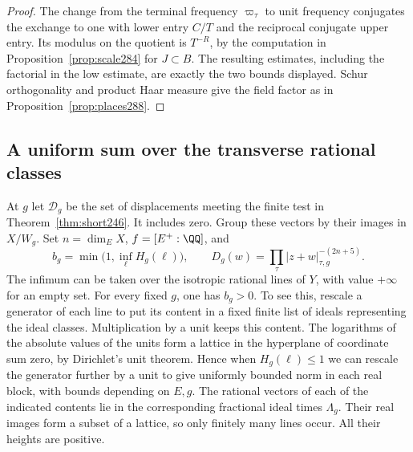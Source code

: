 \documentclass[a4paper,11pt]{article}
\theoremstyle{definition}
\theoremstyle{remark}
\numberwithin{equation}{section}
\begin{document}
\begin{proof}
The change from the terminal frequency \(\varpi_\tau\) to
unit frequency conjugates the exchange to one with lower
entry \(C/T\) and the reciprocal conjugate upper entry.
Its modulus on the quotient is \(T^{-R}\), by the
computation in Proposition~\ref{prop:scale284} for
\(J\subset B\). The resulting estimates, including the
factorial in the low estimate, are exactly the two
bounds displayed. Schur orthogonality and product Haar
measure give the field factor as in
Proposition~\ref{prop:places288}.
\end{proof}

\subsection{A uniform sum over the transverse rational classes}\label{nav:VII-38}
At \(g\) let \(\mathcal D_g\) be the set of displacements meeting
the finite test in Theorem~\ref{thm:short246}. It includes zero.
Group these vectors by their images in \(X/W_g\). Set \(n=\dim_E X\),
\(f=[E^+:\QQ]\), and
\[
 b_g=\min\bigl(1,\inf_{\ell}H_g(\ell)\bigr),\qquad
 D_g(w)=\prod_\tau |z+w|_{\tau,g}^{-(2n+5)}.
\]
The infimum can be taken over the isotropic rational lines of
\(Y\), with value \(+\infty\) for an empty set.
For every fixed \(g\), one has \(b_g>0\). To see this, rescale a
generator of each line to put its content in a fixed finite list
of ideals representing the ideal classes. Multiplication by a unit
keeps this content. The logarithms of the absolute values of the
units form a lattice in the hyperplane of coordinate sum zero,
by Dirichlet's unit theorem. Hence when \(H_g(\ell)\le1\) we can
rescale the generator further by a unit to give uniformly bounded
norm in each real block, with bounds depending on \(E,g\).
The rational vectors of each of the indicated contents lie in
the corresponding fractional ideal times \(\Lambda_g\).
Their real images form a subset of a lattice, so only finitely
many lines occur. All their heights are positive.
\end{document}
